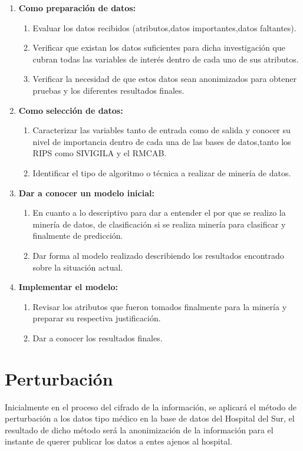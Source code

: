 \documentclass[a4paper,openright,12pt]{book}
\theoremstyle{definition}
\theoremstyle{remark}
\begin{document}
\begin{enumerate}
	\item \textbf{Como preparación de datos:}
    \begin{enumerate}
		\item Evaluar los datos recibidos (atributos,datos importantes,datos faltantes).
    	\item Verificar que existan los datos suficientes para dicha investigación que cubran todas las variables de interés dentro de cada uno de sus atributos.
    	\item Verificar la necesidad de que estos datos sean anonimizados para obtener pruebas y los diferentes resultados finales.
	\end{enumerate}
    \item \textbf{Como selección de datos:}
    \begin{enumerate}
		\item Caracterizar las variables tanto de entrada como de salida y conocer su nivel de importancia dentro de cada una de las bases de datos,tanto los RIPS como SIVIGILA y el RMCAB.
    	\item Identificar el tipo de algoritmo o técnica a realizar de minería de datos.
	\end{enumerate}
    \item \textbf{Dar a conocer un modelo inicial:}
     \begin{enumerate}
		\item En cuanto a lo descriptivo para dar a entender el por que se realizo la minería de datos, de clasificación si se realiza minería para clasificar y finalmente de predicción.
    	\item Dar forma al modelo realizado describiendo  los resultados encontrado sobre la situación actual.
	\end{enumerate}
    \item \textbf{Implementar el modelo:}
      \begin{enumerate}
		\item Revisar los atributos que fueron tomados finalmente para la minería y preparar su respectiva justificación.
    	\item Dar a conocer los resultados finales.
	\end{enumerate}
\end{enumerate}

\section{Perturbación}
Inicialmente en el proceso del cifrado de la información, se aplicará el método de perturbación a los datos tipo médico en la base de datos del Hospital del Sur, el resultado de dicho método será la anonimización de la información para el instante de querer publicar los datos a entes ajenos al hospital.
\end{document}
